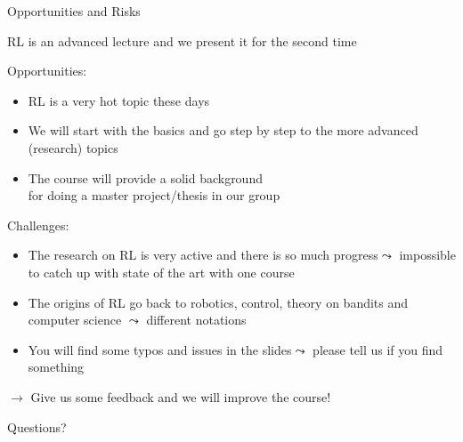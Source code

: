 \documentclass[aspectratio=169]{./latex_main/tntbeamer}  %
\begin{document}
\begin{frame}[c]{Opportunities and Risks}
	
	\vspace{-1em}
	RL is an advanced lecture and we present it for the second time
	
	\medskip
	\pause
	
	Opportunities:
	\begin{itemize}
		\item RL is a very hot topic these days
		\item We will start with the basics and go step by step to the more advanced (research) topics
		\item The course will provide a solid background\\ for doing a master project/thesis in our group 
	\end{itemize}
	
	\pause
	
	Challenges:
	\begin{itemize}
		\item The research on RL is very active and there is so much progress\newline $\leadsto$ impossible to catch up with state of the art with one course
		\item The origins of RL go back to robotics, control, theory on bandits and computer science $\leadsto$ different notations
		\item You will find some typos and issues in the slides\newline $\leadsto$ please tell us if you find something
	\end{itemize}
	
	\pause
	$\to$ Give us some feedback and we will improve the course!
	
	
\end{frame}

\begin{frame}[c]{}
	
	\centering
	\huge
	Questions?
	
\end{frame}


\end{document}
